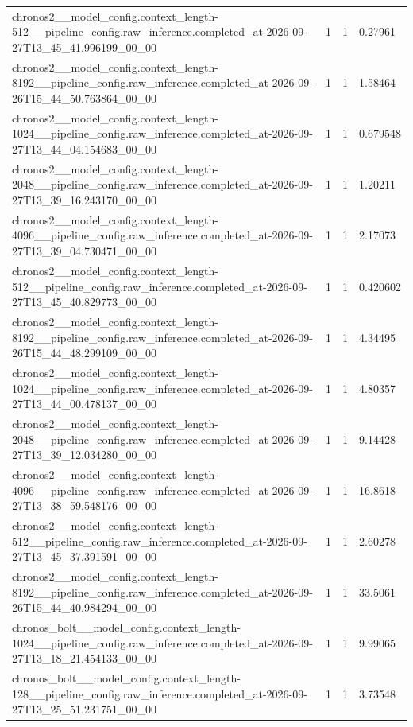 \begin{tabular}{llll}
chronos2\_\_model\_config.context\_length-512\_\_pipeline\_config.raw\_inference.completed\_at-2026-09-27T13\_45\_41.996199\_00\_00 & 1 & 1 & 0.27961 \\
chronos2\_\_model\_config.context\_length-8192\_\_pipeline\_config.raw\_inference.completed\_at-2026-09-26T15\_44\_50.763864\_00\_00 & 1 & 1 & 1.58464 \\
chronos2\_\_model\_config.context\_length-1024\_\_pipeline\_config.raw\_inference.completed\_at-2026-09-27T13\_44\_04.154683\_00\_00 & 1 & 1 & 0.679548 \\
chronos2\_\_model\_config.context\_length-2048\_\_pipeline\_config.raw\_inference.completed\_at-2026-09-27T13\_39\_16.243170\_00\_00 & 1 & 1 & 1.20211 \\
chronos2\_\_model\_config.context\_length-4096\_\_pipeline\_config.raw\_inference.completed\_at-2026-09-27T13\_39\_04.730471\_00\_00 & 1 & 1 & 2.17073 \\
chronos2\_\_model\_config.context\_length-512\_\_pipeline\_config.raw\_inference.completed\_at-2026-09-27T13\_45\_40.829773\_00\_00 & 1 & 1 & 0.420602 \\
chronos2\_\_model\_config.context\_length-8192\_\_pipeline\_config.raw\_inference.completed\_at-2026-09-26T15\_44\_48.299109\_00\_00 & 1 & 1 & 4.34495 \\
chronos2\_\_model\_config.context\_length-1024\_\_pipeline\_config.raw\_inference.completed\_at-2026-09-27T13\_44\_00.478137\_00\_00 & 1 & 1 & 4.80357 \\
chronos2\_\_model\_config.context\_length-2048\_\_pipeline\_config.raw\_inference.completed\_at-2026-09-27T13\_39\_12.034280\_00\_00 & 1 & 1 & 9.14428 \\
chronos2\_\_model\_config.context\_length-4096\_\_pipeline\_config.raw\_inference.completed\_at-2026-09-27T13\_38\_59.548176\_00\_00 & 1 & 1 & 16.8618 \\
chronos2\_\_model\_config.context\_length-512\_\_pipeline\_config.raw\_inference.completed\_at-2026-09-27T13\_45\_37.391591\_00\_00 & 1 & 1 & 2.60278 \\
chronos2\_\_model\_config.context\_length-8192\_\_pipeline\_config.raw\_inference.completed\_at-2026-09-26T15\_44\_40.984294\_00\_00 & 1 & 1 & 33.5061 \\
chronos\_bolt\_\_model\_config.context\_length-1024\_\_pipeline\_config.raw\_inference.completed\_at-2026-09-27T13\_18\_21.454133\_00\_00 & 1 & 1 & 9.99065 \\
chronos\_bolt\_\_model\_config.context\_length-128\_\_pipeline\_config.raw\_inference.completed\_at-2026-09-27T13\_25\_51.231751\_00\_00 & 1 & 1 & 3.73548 \\

\end{tabular}
